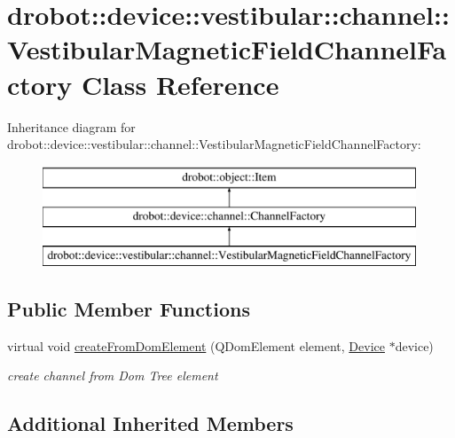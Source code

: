 \hypertarget{classdrobot_1_1device_1_1vestibular_1_1channel_1_1VestibularMagneticFieldChannelFactory}{\section{drobot\-:\-:device\-:\-:vestibular\-:\-:channel\-:\-:Vestibular\-Magnetic\-Field\-Channel\-Factory Class Reference}
\label{classdrobot_1_1device_1_1vestibular_1_1channel_1_1VestibularMagneticFieldChannelFactory}
}
Inheritance diagram for drobot\-:\-:device\-:\-:vestibular\-:\-:channel\-:\-:Vestibular\-Magnetic\-Field\-Channel\-Factory\-:\begin{figure}[H]
\begin{center}
\leavevmode
\includegraphics[height=3.000000cm]{classdrobot_1_1device_1_1vestibular_1_1channel_1_1VestibularMagneticFieldChannelFactory}
\end{center}
\end{figure}
\subsection*{Public Member Functions}
\begin{DoxyCompactItemize}
\item 
virtual void \hyperlink{classdrobot_1_1device_1_1vestibular_1_1channel_1_1VestibularMagneticFieldChannelFactory_a9eee36d4270b5beaa7e56a62bd916aa5}{create\-From\-Dom\-Element} (Q\-Dom\-Element element, \hyperlink{classdrobot_1_1device_1_1Device}{Device} $\ast$device)
\begin{DoxyCompactList}\small\item\em create channel from Dom Tree element \end{DoxyCompactList}\end{DoxyCompactItemize}
\subsection*{Additional Inherited Members}


